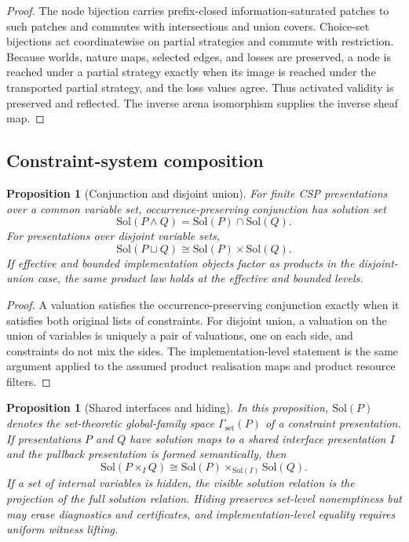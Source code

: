 \documentclass[11pt]{article}
\theoremstyle{plain}
\newtheorem{proposition}[theorem]{Proposition}
\theoremstyle{definition}
\theoremstyle{remark}
\begin{document}
\begin{proof}
The node bijection carries prefix-closed information-saturated patches to such
patches and commutes with intersections and union covers. Choice-set bijections
act coordinatewise on partial strategies and commute with restriction. Because
worlds, nature maps, selected edges, and losses are preserved, a node is reached
under a partial strategy exactly when its image is reached under the transported
partial strategy, and the loss values agree. Thus activated validity is preserved
and reflected. The inverse arena isomorphism supplies the inverse sheaf map.
\end{proof}

\subsection{Constraint-system composition}

\begin{proposition}[Conjunction and disjoint union]
\label{prop:csp-composition-monograph}
For finite CSP presentations over a common variable set, occurrence-preserving
conjunction has solution set
\[
\mathrm{Sol}(P\wedge Q)=\mathrm{Sol}(P)\cap\mathrm{Sol}(Q).
\]
For presentations over disjoint variable sets,
\[
\mathrm{Sol}(P\sqcup Q)\cong\mathrm{Sol}(P)\times\mathrm{Sol}(Q).
\]
If effective and bounded implementation objects factor as products in the
disjoint-union case, the same product law holds at the effective and bounded
levels.
\end{proposition}

\begin{proof}
A valuation satisfies the occurrence-preserving conjunction exactly when it
satisfies both original lists of constraints. For disjoint union, a valuation on
the union of variables is uniquely a pair of valuations, one on each side, and
constraints do not mix the sides. The implementation-level statement is the same
argument applied to the assumed product realisation maps and product resource
filters.
\end{proof}

\begin{proposition}[Shared interfaces and hiding]
\label{prop:pullback-hiding-monograph}
In this proposition, $\mathrm{Sol}(P)$ denotes the set-theoretic global-family
space $\Gamma_{\mathrm{set}}(P)$ of a constraint presentation. If presentations
$P$ and $Q$ have solution maps to a shared interface presentation $I$ and the
pullback presentation is formed semantically, then
\[
\mathrm{Sol}(P\times_I Q)
\cong
\mathrm{Sol}(P)\times_{\mathrm{Sol}(I)}\mathrm{Sol}(Q).
\]
If a set of internal variables is hidden, the visible solution relation is the
projection of the full solution relation. Hiding preserves set-level nonemptiness
but may erase diagnostics and certificates, and implementation-level equality
requires uniform witness lifting.
\end{proposition}
\end{document}
